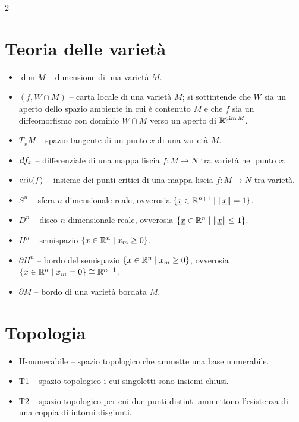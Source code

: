 \begin{multicols*}{2}
      \section*{Teoria delle varietà}

      \begin{itemize}
            \item $\dim M$ -- dimensione di una varietà $M$.
            \item $(f, W \cap M)$ -- carta locale di una varietà $M$; si sottintende che $W$ sia un aperto dello spazio ambiente in cui è contenuto $M$ e
                  che $f$ sia un diffeomorfismo con dominio $W \cap M$ verso un aperto di $\mathbb{R}^{\dim M}$.
            \item $T_x M$ -- spazio tangente di un punto $x$ di una varietà $M$.
            \item $\dif f_x$ -- differenziale di una mappa liscia $f : M \to N$ tra varietà nel punto $x$.
            \item $\operatorname{crit}(f)$ -- insieme dei punti critici di una mappa liscia $f : M \to N$ tra varietà.
            \item $S^n$ -- sfera $n$-dimensionale reale, ovverosia $\{{\underline{x}} \in \mathbb{R}^{n+1} \mid \left\lVert {\underline{x}} \right\rVert = 1\}$.
            \item $D^n$ -- disco $n$-dimensionale reale, ovverosia $\{{\underline{x}} \in \mathbb{R}^{n} \mid \left\lVert {\underline{x}} \right\rVert \leq 1\}$.
            \item $H^n$ -- semispazio $\{ x \in \mathbb{R}^n \mid x_m \geq 0 \}$.
            \item $\partial H^n$ -- bordo del semispazio $\{ x \in \mathbb{R}^n \mid x_m \geq 0 \}$, ovverosia $\{ x \in \mathbb{R}^n \mid x_m = 0 \} \cong \mathbb{R}^{n-1}$.
            \item $\partial M$ -- bordo di una varietà bordata $M$.
      \end{itemize}

      \section*{Topologia}

      \begin{itemize}
            \item II-numerabile -- spazio topologico che ammette una base numerabile.
            \item T1 -- spazio topologico i cui singoletti sono insiemi chiusi.
            \item T2 -- spazio topologico per cui due punti distinti ammettono l'esistenza di una coppia di intorni disgiunti.
      \end{itemize}
\end{multicols*}
